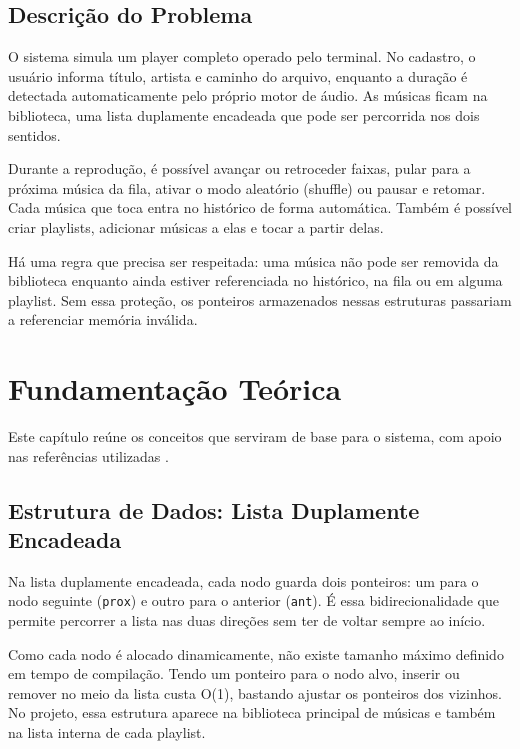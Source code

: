 \documentclass[
    12pt
    ,oneside
    ,a4paper
    ,chapter=TITLE
    ,section=TITLE
    ,sumario=abnt-6027-2012]{abntex2}
\begin{document}
\section{Descrição do Problema}

O sistema simula um player completo operado pelo terminal. No cadastro, o usuário informa título, artista e caminho do arquivo, enquanto a duração é detectada automaticamente pelo próprio motor de áudio. As músicas ficam na biblioteca, uma lista duplamente encadeada que pode ser percorrida nos dois sentidos.

Durante a reprodução, é possível avançar ou retroceder faixas, pular para a próxima música da fila, ativar o modo aleatório (shuffle) ou pausar e retomar. Cada música que toca entra no histórico de forma automática. Também é possível criar playlists, adicionar músicas a elas e tocar a partir delas.

Há uma regra que precisa ser respeitada: uma música não pode ser removida da biblioteca enquanto ainda estiver referenciada no histórico, na fila ou em alguma playlist. Sem essa proteção, os ponteiros armazenados nessas estruturas passariam a referenciar memória inválida.

\chapter{Fundamentação Teórica}
\label{cap:fundamentacao}

Este capítulo reúne os conceitos que serviram de base para o sistema, com apoio nas referências utilizadas \cite{bhargava2017,baroni2026slides}.

\section{Estrutura de Dados: Lista Duplamente Encadeada}

Na lista duplamente encadeada, cada nodo guarda dois ponteiros: um para o nodo seguinte (\texttt{prox}) e outro para o anterior (\texttt{ant}). É essa bidirecionalidade que permite percorrer a lista nas duas direções sem ter de voltar sempre ao início.

Como cada nodo é alocado dinamicamente, não existe tamanho máximo definido em tempo de compilação. Tendo um ponteiro para o nodo alvo, inserir ou remover no meio da lista custa O(1), bastando ajustar os ponteiros dos vizinhos. No projeto, essa estrutura aparece na biblioteca principal de músicas e também na lista interna de cada playlist.
\end{document}
